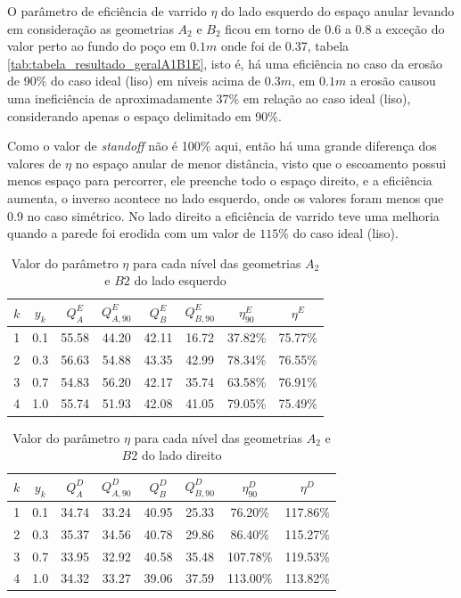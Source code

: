 O parâmetro de eficiência de varrido $\eta$ do lado esquerdo do espaço anular levando em consideração as geometrias $A_2$ e $B_2$ ficou em torno de 0.6 a 0.8 a exceção do valor perto ao fundo do poço em $0.1m$ onde foi de 0.37, tabela \ref{tab:tabela_resultado_geralA1B1E}, isto é, há uma eficiência no caso da erosão de 90\% do caso ideal (liso) em níveis acima de $0.3m$, em $0.1m$ a erosão causou uma ineficiência de aproximadamente 37\% em relação ao caso ideal (liso), considerando apenas o espaço delimitado em 90\%. 
    
Como o valor de \textit{standoff} não é 100\% aqui, então há uma grande diferença dos valores de $\eta$ no espaço anular de menor distância, visto que o escoamento possui menos espaço para percorrer, ele preenche todo o espaço direito, e a eficiência aumenta, o inverso acontece no lado esquerdo, onde os valores foram menos que 0.9 no caso simétrico. No lado direito a eficiência de varrido teve uma melhoria quando a parede foi erodida com um valor de $115\%$ do caso ideal (liso).
    
    \begin{table}[H]
        \centering
        \caption{Valor do parâmetro $\eta$ para cada nível das geometrias $A_2$ e $B2$ do lado esquerdo}
    	\begin{tabular}{cccccccc}
    		\hline
    		$k$ & $y_k$ & $Q_A^E$ & $Q_{A,90}^E$ & $Q_B^E$ & $Q_{B,90}^E$ & $\eta_{90}^E$ & $\eta^E$ \\
    		\hline
    		1 & 0.1 & 55.58 & 44.20 & 42.11 & 16.72 & 37.82\% & 75.77\% \\
    		2 & 0.3 & 56.63 & 54.88 & 43.35 & 42.99 & 78.34\% & 76.55\% \\
    		3 & 0.7 & 54.83 & 56.20 & 42.17 & 35.74 & 63.58\% & 76.91\% \\
    		4 & 1.0 & 55.74 & 51.93 & 42.08 & 41.05 & 79.05\% & 75.49\% \\
    		\hline
    	\end{tabular}
    	\label{tab:tabela_resultado_geralA2B2E}
    \end{table}
    
    \begin{table}[H]
        \centering
        \caption{Valor do parâmetro $\eta$ para cada nível das geometrias $A_2$ e $B2$ do lado direito}
    	\begin{tabular}{cccccccc}
    		\hline
    		$k$ & $y_k$ & $Q_A^D$ & $Q_{A,90}^D$ & $Q_B^D$ & $Q_{B,90}^D$ & $\eta_{90}^D$ & $\eta^D$ \\
    		\hline
    		1 & 0.1 & 34.74 & 33.24 & 40.95 & 25.33 & 76.20\% & 117.86\% \\
    		2 & 0.3 & 35.37 & 34.56 & 40.78 & 29.86 & 86.40\% & 115.27\% \\
    		3 & 0.7 & 33.95 & 32.92 & 40.58 & 35.48 & 107.78\% & 119.53\% \\
    		4 & 1.0 & 34.32 & 33.27 & 39.06 & 37.59 & 113.00\% & 113.82\% \\
    		\hline
    	\end{tabular}
    	\label{tab:tabela_resultado_geralA2B2D}
    \end{table}
    
